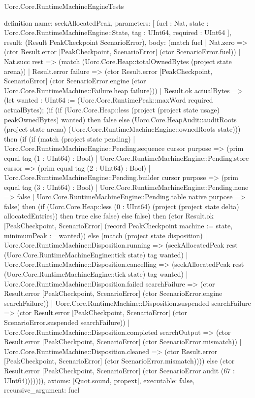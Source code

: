 \begin{lexlean}{Uorc.Core.RuntimeMachineEngineTests}
\begin{semanticmodule}
definition{
  name: seekAllocatedPeak,
  parameters: [
    fuel : Nat,
    state : Uorc.Core.RuntimeMachineEngine::State,
    tag : UInt64,
    required : UInt64
  ],
  result: (Result PeakCheckpoint ScenarioError),
  body: (match fuel
    | Nat.zero => (ctor Result.error [PeakCheckpoint, ScenarioError] (ctor ScenarioError.fuel))
    | Nat.succ rest => (match (Uorc.Core.Heap::totalOwnedBytes (project state arena))
      | Result.error failure => (ctor Result.error [PeakCheckpoint, ScenarioError] (ctor ScenarioError.engine (ctor Uorc.Core.RuntimeMachine::Failure.heap failure)))
      | Result.ok actualBytes => (let wanted : UInt64 := (Uorc.Core.RuntimePeak::maxWord required actualBytes); (if (if (Uorc.Core.Heap::less (project (project state usage) peakOwnedBytes) wanted) then false else (Uorc.Core.HeapAudit::auditRoots (project state arena) (Uorc.Core.RuntimeMachineEngine::ownedRoots state))) then (if (if (match (project state pending)
        | Uorc.Core.RuntimeMachineEngine::Pending.sequence cursor purpose => (prim equal tag (1 : UInt64) : Bool)
        | Uorc.Core.RuntimeMachineEngine::Pending.store cursor => (prim equal tag (2 : UInt64) : Bool)
        | Uorc.Core.RuntimeMachineEngine::Pending.builder cursor purpose => (prim equal tag (3 : UInt64) : Bool)
        | Uorc.Core.RuntimeMachineEngine::Pending.none => false
        | Uorc.Core.RuntimeMachineEngine::Pending.table native purpose => false) then (if (Uorc.Core.Heap::less (0 : UInt64) (project (project state delta) allocatedEntries)) then true else false) else false) then (ctor Result.ok [PeakCheckpoint, ScenarioError] (record PeakCheckpoint {machine := state, minimumPeak := wanted})) else (match (project state disposition)
        | Uorc.Core.RuntimeMachine::Disposition.running => (seekAllocatedPeak rest (Uorc.Core.RuntimeMachineEngine::tick state) tag wanted)
        | Uorc.Core.RuntimeMachine::Disposition.cancelling => (seekAllocatedPeak rest (Uorc.Core.RuntimeMachineEngine::tick state) tag wanted)
        | Uorc.Core.RuntimeMachine::Disposition.failed searchFailure => (ctor Result.error [PeakCheckpoint, ScenarioError] (ctor ScenarioError.engine searchFailure))
        | Uorc.Core.RuntimeMachine::Disposition.suspended searchFailure => (ctor Result.error [PeakCheckpoint, ScenarioError] (ctor ScenarioError.suspended searchFailure))
        | Uorc.Core.RuntimeMachine::Disposition.completed searchOutput => (ctor Result.error [PeakCheckpoint, ScenarioError] (ctor ScenarioError.mismatch))
        | Uorc.Core.RuntimeMachine::Disposition.cleaned => (ctor Result.error [PeakCheckpoint, ScenarioError] (ctor ScenarioError.mismatch)))) else (ctor Result.error [PeakCheckpoint, ScenarioError] (ctor ScenarioError.audit (67 : UInt64))))))),
  axioms: [Quot.sound, propext],
  executable: false,
  recursive_argument: fuel
}


\end{semanticmodule}
\end{lexlean}
